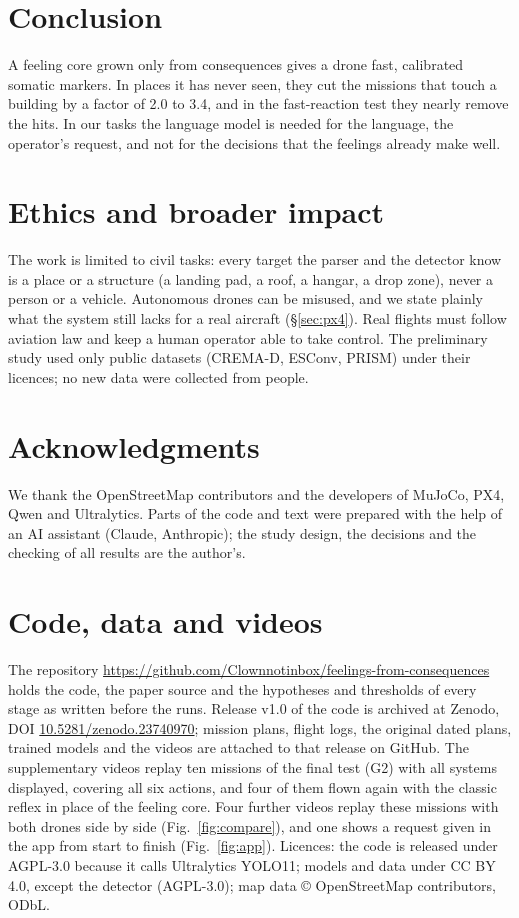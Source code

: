 \documentclass[10pt]{article}
\begin{document}
\section{Conclusion}
A feeling core grown only from consequences gives a drone fast, calibrated somatic markers. In places it has never seen, they cut the
missions that touch a building by a factor of 2.0 to 3.4, and in the fast-reaction test they nearly remove the hits. In our tasks the language model is needed for the
language, the operator's request, and not for the decisions that the feelings already make well. \GCONCL

\section*{Ethics and broader impact}
The work is limited to civil tasks: every target the parser and the detector know is a place or a structure (a landing pad, a
roof, a hangar, a drop zone), never a person or a vehicle. Autonomous drones can be misused, and we state plainly what the system
still lacks for a real aircraft (\S\ref{sec:px4}). Real flights must follow aviation law and keep a human operator able to take
control. The preliminary study used only public datasets (CREMA-D, ESConv, PRISM) under their licences; no new data were collected
from people.

\section*{Acknowledgments}
We thank the OpenStreetMap contributors and the developers of MuJoCo, PX4, Qwen and Ultralytics. Parts of the code and text were
prepared with the help of an AI assistant (Claude, Anthropic); the study design, the decisions and the checking of all results are
the author's.

\section*{Code, data and videos}
The repository {\url{https://github.com/Clownnotinbox/feelings-from-consequences}}
holds the code, the paper source and the hypotheses and thresholds of every stage as written before the runs. Release v1.0 of the code is archived at Zenodo, DOI \href{https://doi.org/10.5281/zenodo.23740970}{10.5281/zenodo.23740970}; mission plans, flight logs, the original dated plans,
trained models and the videos are attached to that release on GitHub. The supplementary videos replay ten
missions of the final test (G2) with all systems displayed, covering all six actions, and four of them flown again with the
classic reflex in place of the feeling core. Four further videos replay these missions with both drones side by side
(Fig.~\ref{fig:compare}), and one shows a request given in the app from start to finish (Fig.~\ref{fig:app}). Licences: the code is released under AGPL-3.0 because it calls Ultralytics YOLO11;
models and data under CC BY 4.0, except the detector (AGPL-3.0); map data \copyright{} OpenStreetMap contributors, ODbL.
\end{document}
